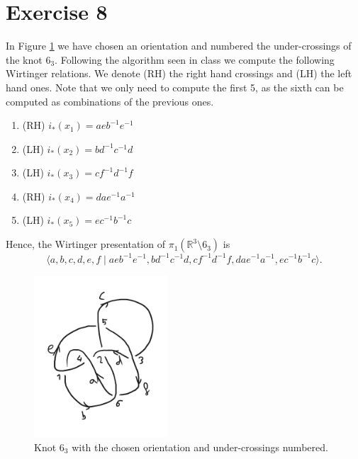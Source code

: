 \documentclass[11pt,a4paper]{article}
\newcommand{\R}{\mathbb R}
\begin{document}
\section*{Exercise 8}
In Figure \ref{fig:63} we have chosen an orientation and numbered the under-crossings of the knot $ 6_3 $. Following the algorithm seen in class we compute the following Wirtinger relations. We denote (RH) the right hand crossings and (LH) the left hand ones. Note that we only need to compute the first 5, as the sixth can be computed as combinations of the previous ones.
\renewcommand{\theenumi}{\arabic{enumi}} 
\begin{enumerate}
  \item (RH) $ i_*(x_1) = a e b^{-1} e^{-1} $
  \item (LH) $ i_*(x_2) = b d^{-1} c^{-1} d $
  \item (LH) $ i_*(x_3) = c f^{-1} d^{-1} f $
  \item (RH) $ i_*(x_4) = d a e^{-1} a^{-1} $
  \item (LH) $ i_*(x_5) = e c^{-1} b^{-1} c $
\end{enumerate}
Hence, the Wirtinger presentation of $ \pi_1 (\R^3 \setminus 6_3) $ is
$$
  \langle a, b, c, d, e, f \mid a e b^{-1} e^{-1}, b d^{-1} c^{-1} d, c f^{-1} d^{-1} f, d a e^{-1} a^{-1}, e c^{-1} b^{-1} c\rangle.
$$
\begin{figure}[h]
  \centering
  \includegraphics[width=5cm]{63.pdf}
  \caption{Knot $6_3$ with the chosen orientation and under-crossings numbered.}
  \label{fig:63}
\end{figure}
\end{document}
